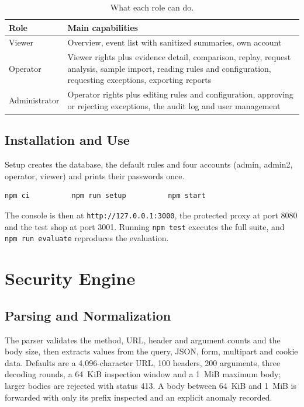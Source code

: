 \documentclass{FastFyp}
\begin{document}
\begin{table}[!h]
\centering
\caption{What each role can do.}
{\small\singlespacing\renewcommand{\arraystretch}{1.3}
\begin{tabular}{|p{2.4cm}|p{11.1cm}|}
\hline
\textbf{Role} & \textbf{Main capabilities} \\
\hline
Viewer & Overview, event list with sanitized summaries, own account \\
\hline
Operator & Viewer rights plus evidence detail, comparison, replay, request analysis, sample import, reading rules and configuration, requesting exceptions, exporting reports \\
\hline
Administrator & Operator rights plus editing rules and configuration, approving or rejecting exceptions, the audit log and user management \\
\hline
\end{tabular}}
\label{tab:roles}
\end{table}

\section{Installation and Use}
Setup creates the database, the default rules and four accounts (admin, admin2, operator, viewer) and prints their passwords once.
{\small\singlespacing
\begin{verbatim}
npm ci          npm run setup          npm start
\end{verbatim}}
The console is then at \texttt{http://127.0.0.1:3000}, the protected proxy at port 8080 and the test shop at port 3001. Running \texttt{npm test} executes the full suite, and \texttt{npm run evaluate} reproduces the evaluation.

\chapter{Security Engine}
\section{Parsing and Normalization}
The parser validates the method, URL, header and argument counts and the body size, then extracts values from the query, JSON, form, multipart and cookie data. Defaults are a 4,096-character URL, 100 headers, 200 arguments, three decoding rounds, a 64~KiB inspection window and a 1~MiB maximum body; larger bodies are rejected with status 413. A body between 64~KiB and 1~MiB is forwarded with only its prefix inspected and an explicit anomaly recorded.
\end{document}

